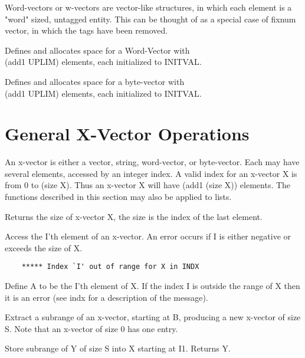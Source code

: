   Word-vectors or w-vectors are vector-like structures, in which
each element is a "word" sized, untagged entity.   This  can  be
thought of as a special case of fixnum vector, in which the tags
have been removed.

{    Defines  and  allocates  space  for a Word-Vector with\\ 
     (add1 UPLIM) elements, each initialized to INITVAL.
}

{    Defines and allocates space for  a  byte-vector  with\\
     (add1 UPLIM) elements, each initialized to INITVAL.
}
\section{General X-Vector Operations}

  An   x-vector   is   either  a  vector,  string,  word-vector,
or  byte-vector.    Each  may   have   several
elements,  accessed  by  an integer index.  A valid index for an
x-vector X is from 0 to (size X).  Thus an x-vector X will  have
(add1 (size X)) elements. The functions described in this
section may also be applied to lists.

{    Returns the size of x-vector X, the size is the index of the
    last element.
}

{    Access the I'th element of an x-vector.  An error occurs  if
    I is either negative or exceeds the size of X.
}
\begin{verbatim}
    ***** Index `I' out of range for X in INDX
\end{verbatim}

{    Define  A  to  be  the I'th element of X.  If the index I is
    outside the range of X then it is an error (see indx  for  a
    description of the message).
}

{    Extract  a subrange of an x-vector, starting at B, producing
    a new x-vector of size S.  Note that an x-vector of  size  0
    has one entry.
}

{    
    Store  subrange  of  Y  of  size  S  into  X starting at I1.
    Returns Y.
}

